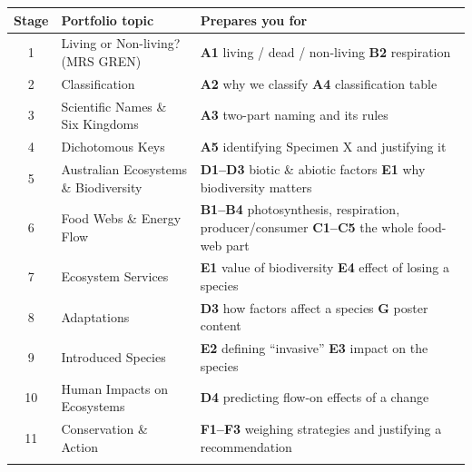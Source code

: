 \documentclass[11pt,a4paper]{article}
\begin{document}
\noindent\begin{tabularx}{\linewidth}{@{}c>{\raggedright\arraybackslash}p{6.1cm}>{\RaggedRight\arraybackslash}X@{}}
  \toprule
  \rowcolor{TableHead}
  \headingfont\bfseries\color{white} Stage &
  \headingfont\bfseries\color{white} Portfolio topic &
  \headingfont\bfseries\color{white} Prepares you for \\
  \midrule
  1 & Living or Non-living? (MRS GREN)      & \textbf{A1} living / dead / non-living \textbullet{} \textbf{B2} respiration \\
  \rowcolor{RowAlt}
  2 & Classification                        & \textbf{A2} why we classify \textbullet{} \textbf{A4} classification table \\
  3 & Scientific Names \& Six Kingdoms      & \textbf{A3} two-part naming and its rules \\
  \rowcolor{RowAlt}
  4 & Dichotomous Keys                      & \textbf{A5} identifying Specimen X and justifying it \\
  5 & Australian Ecosystems \& Biodiversity & \textbf{D1--D3} biotic \& abiotic factors \textbullet{} \textbf{E1} why biodiversity matters \\
  \rowcolor{RowAlt}
  6 & Food Webs \& Energy Flow              & \textbf{B1--B4} photosynthesis, respiration, producer/consumer \textbullet{} \textbf{C1--C5} the whole food-web part \\
  7 & Ecosystem Services                    & \textbf{E1} value of biodiversity \textbullet{} \textbf{E4} effect of losing a species \\
  \rowcolor{RowAlt}
  8 & Adaptations                           & \textbf{D3} how factors affect a species \textbullet{} \textbf{G} poster content \\
  9 & Introduced Species                    & \textbf{E2} defining ``invasive'' \textbullet{} \textbf{E3} impact on the species \\
  \rowcolor{RowAlt}
  10 & Human Impacts on Ecosystems          & \textbf{D4} predicting flow-on effects of a change \\
  11 & Conservation \& Action               & \textbf{F1--F3} weighing strategies and justifying a recommendation \\
  \midrule
  \rowcolor{GoldLight}
  \bottomrule
\end{tabularx}

\medskip
\end{document}
